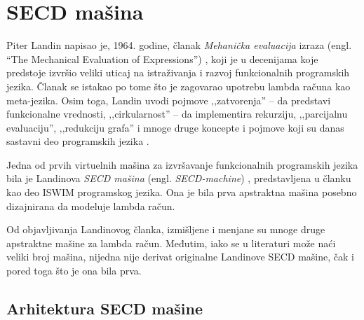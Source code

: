 \section{SECD mašina}
\label{sec:secd-masina}

%

Piter Landin napisao je, 1964. godine, članak {\em Mehanička evaluacija} izraza (engl. “The Mechanical Evaluation of Expressions”) \cite{landinsecd}, koji je u decenijama koje predstoje izvršio veliki uticaj na istraživanja i razvoj funkcionalnih programskih jezika. Članak se istakao po tome što je zagovarao upotrebu lambda računa kao meta-jezika. Osim toga, Landin uvodi pojmove ‚‚zatvorenja'' -- da predstavi funkcionalne vrednosti, ‚‚cirkularnost'' -- da implementira rekurziju, ‚‚parcijalnu evaluaciju'', ‚‚redukciju grafa'' i mnoge druge koncepte i pojmove koji su danas sastavni deo programskih jezika \cite{calls-lambda, compiler-design}.

Jedna od prvih virtuelnih mašina za izvršavanje funkcionalnih programskih jezika bila je Landinova {\em SECD mašina} (engl. \textit{SECD-machine}) \cite{landin-secd}, predstavljena u članku kao deo ISWIM \cite{ISWIM} programskog jezika. Ona je bila prva apstraktna mašina posebno dizajnirana da modeluje lambda račun.

Od objavljivanja Landinovog članka, izmišljene i menjane su mnoge druge apstraktne mašine za lambda račun. Međutim, iako se u literaturi može naći veliki broj mašina, nijedna nije derivat originalne Landinove SECD mašine, čak i pored toga što je ona bila prva.


\subsection{Arhitektura SECD mašine}

